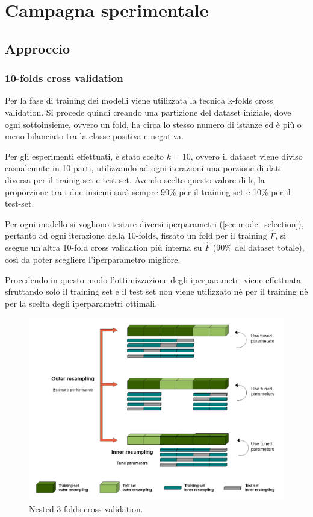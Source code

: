 \chapter{Campagna sperimentale}

\section{Approccio}

\subsection{10-folds cross validation}
Per la fase di training dei modelli viene utilizzata la tecnica k-folds cross validation. Si procede quindi creando una partizione del dataset iniziale, dove ogni sottoinsieme, ovvero un fold, ha circa lo stesso numero di istanze ed è più o meno bilanciato tra la classe positiva e negativa.

Per gli esperimenti effettuati, è stato scelto $k = 10$, ovvero il dataset viene diviso casualemnte in 10 parti, utilizzando ad ogni iterazioni una porzione di dati diversa per il trainig-set e test-set. Avendo scelto questo valore di k, la proporzione tra i due insiemi sarà sempre 90\% per il training-set e 10\% per il test-set.

Per ogni modello si vogliono testare diversi iperparametri (\autoref{sec:mode_selection}), pertanto ad ogni iterazione della 10-folds, fissato un fold per il training $\hat{F}$, si esegue un'altra 10-fold cross validation più interna su $\hat{F}$  ($90\%$ del dataset totale), così da poter scegliere l'iperparametro migliore.

Procedendo in questo modo l'ottimizzazione degli iperparametri viene effettuata sfruttando solo il training set e il test set non viene utilizzato nè per il training nè per la scelta degli iperparametri ottimali.

\begin{figure}[H]
	\centering
	\includegraphics[width=13cm]{assets/nested-cv.png}
	\caption{Nested 3-folds cross validation.}
\end{figure}

